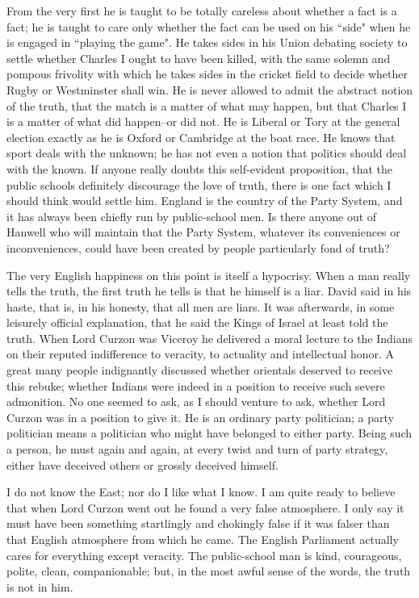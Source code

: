 \documentclass[final,10pt,letterpaper,twocolumn,openany]{book}
\begin{document}
From the very first he is taught to be
totally careless about whether a fact is a fact; he is taught to care only
whether the fact can be used on his ``side" when he is engaged in ``playing
the game". He takes sides in his Union debating society to settle whether
Charles I ought to have been killed, with the same solemn and pompous
frivolity with which he takes sides in the cricket field to decide whether
Rugby or Westminster shall win. He is never allowed to admit the abstract
notion of the truth, that the match is a matter of what may happen, but that
Charles I is a matter of what did happen--or did not. He is Liberal or Tory
at the general election exactly as he is Oxford or Cambridge at the boat
race. He knows that sport deals with the unknown; he has not even a
notion that politics should deal with the known. If anyone really doubts
this self-evident proposition, that the public schools definitely discourage
the love of truth, there is one fact which I should think would settle him.
England is the country of the Party System, and it has always been chiefly
run by public-school men. Is there anyone out of Hanwell who will
maintain that the Party System, whatever its conveniences or
inconveniences, could have been created by people particularly fond of
truth?

The very English happiness on this point is itself a hypocrisy. When a
man really tells the truth, the first truth he tells is that he himself is a liar.
David said in his haste, that is, in his honesty, that all men are liars. It was
afterwards, in some leisurely official explanation, that he said the Kings of
Israel at least told the truth. When Lord Curzon was Viceroy he delivered
a moral lecture to the Indians on their reputed indifference to veracity, to
actuality and intellectual honor. A great many people indignantly discussed
whether orientals deserved to receive this rebuke; whether Indians were
indeed in a position to receive such severe admonition. No one seemed to
ask, as I should venture to ask, whether Lord Curzon was in a position to
give it. He is an ordinary party politician; a party politician means a
politician who might have belonged to either party. Being such a person,
he must again and again, at every twist and turn of party strategy, either
have deceived others or grossly deceived himself. 

I do not know the East;
nor do I like what I know. I am quite ready to believe that when Lord
Curzon went out he found a very false atmosphere. I only say it must have
been something startlingly and chokingly false if it was falser than that
English atmosphere from which he came. The English Parliament actually
cares for everything except veracity. The public-school man is kind,
courageous, polite, clean, companionable; but, in the most awful sense of
the words, the truth is not in him.
\end{document}
